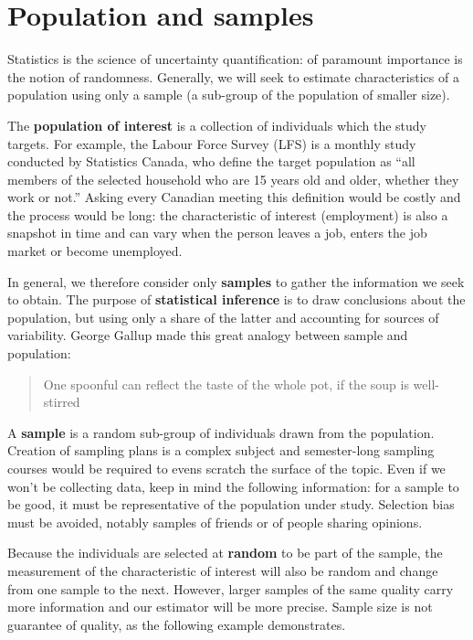 \documentclass[
  11pt,
  letterpaper,
]{book}
\theoremstyle{definition}
\theoremstyle{definition}
\theoremstyle{definition}
\theoremstyle{remark}
\begin{document}
\hypertarget{population-sample}{%
\section{Population and samples}\label{population-sample}}

Statistics is the science of uncertainty quantification: of paramount importance is the notion of randomness. Generally, we will seek to estimate characteristics of a population using only a sample (a sub-group of the population of smaller size).

The \textbf{population of interest} is a collection of individuals which the study targets. For example, the Labour Force Survey (LFS) is a monthly study conducted by Statistics Canada, who define the target population as ``all members of the selected household who are 15 years old and older, whether they work or not.'' Asking every Canadian meeting this definition would be costly and the process would be long: the characteristic of interest (employment) is also a snapshot in time and can vary when the person leaves a job, enters the job market or become unemployed.

In general, we therefore consider only \textbf{samples} to gather the information we seek to obtain. The purpose of \textbf{statistical inference} is to draw conclusions about the population, but using only a share of the latter and accounting for sources of variability. George Gallup made this great analogy between sample and population:

\begin{quote}
One spoonful can reflect the taste of the whole pot, if the soup is well-stirred
\end{quote}

A \textbf{sample} is a random sub-group of individuals drawn from the population. Creation of sampling plans is a complex subject and semester-long sampling courses would be required to evens scratch the surface of the topic. Even if we won't be collecting data, keep in mind the following information: for a sample to be good, it must be representative of the population under study. Selection bias must be avoided, notably samples of friends or of people sharing opinions.

Because the individuals are selected at \textbf{random} to be part of the sample, the measurement of the characteristic of interest will also be random and change from one sample to the next. However, larger samples of the same quality carry more information and our estimator will be more precise. Sample size is not guarantee of quality, as the following example demonstrates.
\end{document}
